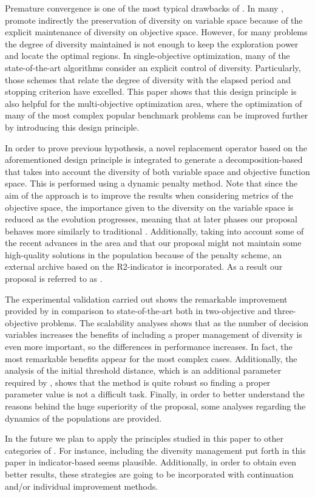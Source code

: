 Premature convergence is one of the most typical drawbacks of \EAS{}.
%
In many \MOPS{}, \MOEAS{} promote indirectly the preservation of diversity on variable space
because of the explicit maintenance of diversity on objective space.
%
However, for many problems the degree of diversity maintained is not enough to keep the exploration
power and locate the optimal regions.
%
In single-objective optimization, many of the state-of-the-art algorithms consider an explicit control of
diversity.
%
Particularly, those schemes that relate the degree of diversity with the elapsed period and stopping criterion
have excelled.
%
This paper shows that this design principle is also helpful for the multi-objective optimization area,
where the optimization of many of the most complex popular benchmark problems can be improved further
by introducing this design principle.

In order to prove previous hypothesis, a novel replacement operator based on the aforementioned design principle
is integrated to generate a decomposition-based \MOEA{} that takes into account the diversity of both variable 
space and objective function space.
%
This is performed using a dynamic penalty method. 
%
Note that since the aim of the approach is to improve the results when considering metrics of the objective space,
the importance given to the diversity on the variable space is reduced as the evolution progresses, meaning that
at later phases our proposal behaves more similarly to traditional \MOEAS{}.
%
Additionally, taking into account some of the recent advances in the area and that our proposal might not maintain
some high-quality solutions in the population because of the penalty scheme, an external archive based on the
R2-indicator is incorporated.
%
As a result our proposal is referred to as \AVSDMOEAD{}.
%

The experimental validation carried out shows the remarkable improvement provided by \AVSDMOEAD{} in comparison to
state-of-the-art \MOEAS{} both in two-objective and three-objective problems.
%
The scalability analyses shows that as the number of decision variables increases the benefits of including
a proper management of diversity is even more important, so the differences in performance increases.
%
In fact, the most remarkable benefits appear for the most complex cases.
%
Additionally, the analysis of the initial threshold distance, which is an additional parameter required by \AVSDMOEAD{}, 
shows that the method is quite robust so finding a proper parameter value is not a difficult task.
%
Finally, in order to better understand the reasons behind the huge superiority of the proposal, some analyses regarding
the dynamics of the populations are provided.

In the future we plan to apply the principles studied in this paper to other categories of \MOEAS{}.
%
For instance, including the diversity management put forth in this paper in indicator-based \MOEAS{} seems plausible.
%
Additionally, in order to obtain even better results, these strategies are going to be incorporated with continuation and/or individual
improvement methods.
